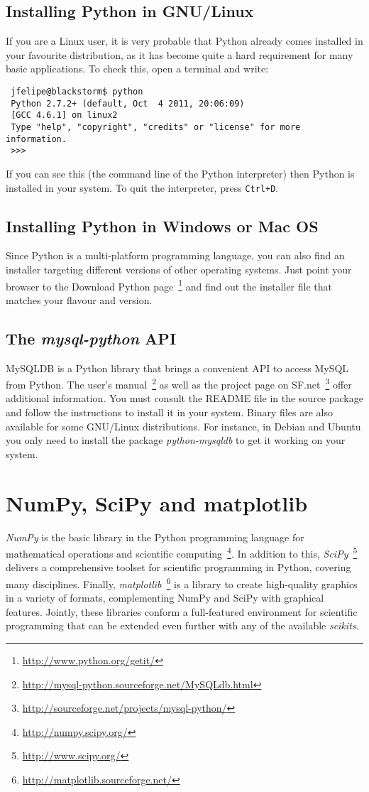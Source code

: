 \subsection{Installing Python in GNU/Linux}
If you are a Linux user, it is very probable that Python already comes installed 
in your favourite distribution, as it has become quite a hard requirement for 
many basic applications. To check this, open a terminal and write:

\begin{verbatim}
 jfelipe@blackstorm$ python
 Python 2.7.2+ (default, Oct  4 2011, 20:06:09) 
 [GCC 4.6.1] on linux2
 Type "help", "copyright", "credits" or "license" for more information.
 >>>
\end{verbatim}

If you can see this (the command line of the Python interpreter) then Python is 
installed in your system. To quit the interpreter, press \texttt{Ctrl+D}.

\subsection{Installing Python in Windows or Mac OS}
Since Python is a multi-platform programming language, you can also find an 
installer targeting different versions of other operating systems. Just point 
your browser to the Download Python page~\footnote{\url{http://www.python.org/getit/}} 
and find out the installer file that matches your flavour and version.

\subsection{The \textit{mysql-python} API}
MySQLDB is a Python library that brings a convenient API to access MySQL from 
Python. The user's manual~\footnote{\url{http://mysql-python.sourceforge.net/MySQLdb.html}}
 as well as the project page on SF.net~\footnote{\url{http://sourceforge.net/projects/mysql-python/}} offer 
additional information. You must consult the README file in the source package 
and follow the instructions to install it in your system.
Binary files are also available for some GNU/Linux distributions. For instance, 
in Debian and Ubuntu you only need to install the package \textit{python-mysqldb} to get 
it working on your system.

\section{NumPy, SciPy and matplotlib}
\textit{NumPy} is the basic library in the Python programming language for
mathematical operations and scientific computing~\footnote{\url{http://numpy.scipy.org/}}.
In addition to this, \textit{SciPy}~\footnote{\url{http://www.scipy.org/}} delivers
a comprehensive toolset for scientific programming in Python, covering many
disciplines. Finally, \textit{matplotlib}~\footnote{\url{http://matplotlib.sourceforge.net/}} 
is a library to create high-quality graphics in a variety of formats, complementing
NumPy and SciPy with graphical features. Jointly, these libraries conform a
full-featured environment for scientific programming that can be extended even
further with any of the available \textit{scikits}.

